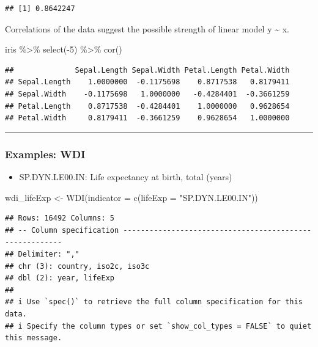\documentclass[
]{article}
\newenvironment{Shaded}{\begin{snugshade}}{\end{snugshade}}
\newcommand{\AttributeTok}[1]{\textcolor[rgb]{0.77,0.63,0.00}{#1}}
\newcommand{\DecValTok}[1]{\textcolor[rgb]{0.00,0.00,0.81}{#1}}
\newcommand{\FunctionTok}[1]{\textcolor[rgb]{0.00,0.00,0.00}{#1}}
\newcommand{\NormalTok}[1]{#1}
\newcommand{\OtherTok}[1]{\textcolor[rgb]{0.56,0.35,0.01}{#1}}
\newcommand{\SpecialCharTok}[1]{\textcolor[rgb]{0.00,0.00,0.00}{#1}}
\newcommand{\StringTok}[1]{\textcolor[rgb]{0.31,0.60,0.02}{#1}}
\providecommand{\tightlist}{%
  \setlength{\itemsep}{0pt}\setlength{\parskip}{0pt}}
\begin{document}
\begin{verbatim}
## [1] 0.8642247
\end{verbatim}

Correlations of the data suggest the possible strength of linear model y
\textasciitilde{} x.

\begin{Shaded}
\begin{Highlighting}[]
\NormalTok{iris }\SpecialCharTok{\%\textgreater{}\%} \FunctionTok{select}\NormalTok{(}\SpecialCharTok{{-}}\DecValTok{5}\NormalTok{) }\SpecialCharTok{\%\textgreater{}\%} \FunctionTok{cor}\NormalTok{()}
\end{Highlighting}
\end{Shaded}

\begin{verbatim}
##              Sepal.Length Sepal.Width Petal.Length Petal.Width
## Sepal.Length    1.0000000  -0.1175698    0.8717538   0.8179411
## Sepal.Width    -0.1175698   1.0000000   -0.4284401  -0.3661259
## Petal.Length    0.8717538  -0.4284401    1.0000000   0.9628654
## Petal.Width     0.8179411  -0.3661259    0.9628654   1.0000000
\end{verbatim}

\begin{center}\rule{0.5\linewidth}{0.5pt}\end{center}

\hypertarget{examples-wdi}{%
\subsubsection{Examples: WDI}\label{examples-wdi}}

\begin{itemize}
\tightlist
\item
  SP.DYN.LE00.IN: Life expectancy at birth, total (years)
\end{itemize}

\begin{Shaded}
\begin{Highlighting}[]
\NormalTok{wdi\_lifeExp }\OtherTok{\textless{}{-}} \FunctionTok{WDI}\NormalTok{(}\AttributeTok{indicator =} \FunctionTok{c}\NormalTok{(}\AttributeTok{lifeExp =} \StringTok{"SP.DYN.LE00.IN"}\NormalTok{))}
\end{Highlighting}
\end{Shaded}

\begin{verbatim}
## Rows: 16492 Columns: 5
## -- Column specification --------------------------------------------------------
## Delimiter: ","
## chr (3): country, iso2c, iso3c
## dbl (2): year, lifeExp
## 
## i Use `spec()` to retrieve the full column specification for this data.
## i Specify the column types or set `show_col_types = FALSE` to quiet this message.
\end{verbatim}
\end{document}
